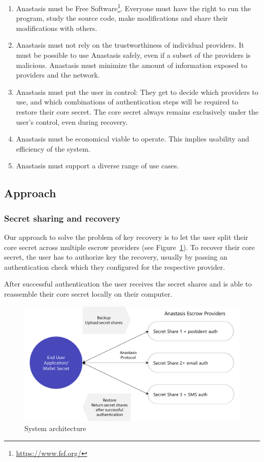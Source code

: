 \begin{enumerate}
 \item Anastasis must be Free Software\footnote{\url{https://www.fsf.org/}}. Everyone must have the right to
   run the program, study the source code, make modifications and share
   their modifications with others.
 \item Anastasis must not rely on the trustworthiness of individual providers.
   It must be possible to use Anastasis safely, even if a subset of the
   providers is malicious. Anastasis must minimize the amount of information
   exposed to providers and the network.
 \item Anastasis must put the user in control: They get to decide which
   providers to use, and which combinations of authentication steps will
   be required to restore their core secret. The core secret always remains exclusively
   under the user's control, even during recovery.
 \item Anastasis must be economical viable to operate. This implies usability
   and efficiency of the system.
 \item Anastasis must support a diverse range of use cases.
\end{enumerate}


\subsection{Approach}

\subsubsection*{Secret sharing and recovery}

Our approach to solve the problem of key recovery is to let the user
split their core secret across multiple escrow providers (see
Figure~\ref{fig:system_arch2}). To recover their core secret, the user has to
authorize key the recovery, usually by passing an authentication check
which they configured for the respective provider.

After successful authentication the user receives the secret shares
and is able to reassemble their core secret locally on their computer.

\begin{figure}[H]
\centering
\includegraphics[scale=0.33]{images/system-architecture_2.png}
\caption{System architecture}
\label{fig:system_arch2}
\end{figure}

